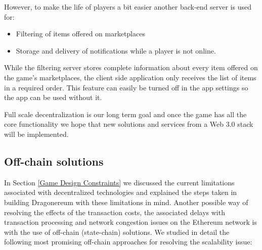 \documentclass[12pt]{article}
\begin{document}
\begin{samepage}
However, to make the life of players a bit easier another back-end server is used for:\par

\begin{itemize}
	\item Filtering of items offered on marketplaces\par

	\item Storage and delivery of notifications while a player is not online.
\end{itemize}\par
\end{samepage}

While the filtering server stores complete information about every item offered on the game’s marketplaces, the client side application only receives the list of items in a required order. This feature can easily be turned off in the app settings so the app can be used without it.\par

Full scale decentralization is our long term goal and once the game has all the core functionality we hope that new solutions and services from a Web 3.0 stack will be implemented.




\vspace{\baselineskip}\subsection{Off-chain solutions}
 \label{Off-chain solutions} \par

In Section \ref{Game Design Constraints} we discussed the current limitations associated with decentralized technologies and explained the steps taken in building Dragonereum with these limitations in mind. Another possible way of resolving the effects of the transaction costs, the associated delays with transaction processing and network congestion issues on the Ethereum network is with the use of off-chain (state-chain) solutions. We studied in detail the following most promising off-chain approaches for resolving the scalability issue:\par
\end{document}
